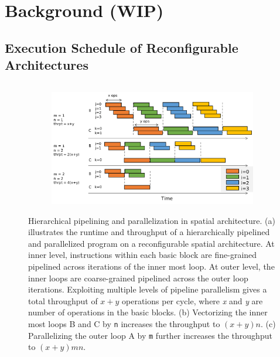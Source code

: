 \chapter{Background (WIP)}

\section{Execution Schedule of Reconfigurable Architectures} 
\begin{figure}
\begin{subfigure}[b]{0.34\textwidth}
\inputminted{python}{code/spatialeg2.py}
\caption {
}
\end{subfigure}
\hfill
\begin{subfigure}[b]{0.65\textwidth}
\centering
\includegraphics[width=1.0\textwidth]{figs/pipeexec.pdf}
\caption {
}
\end{subfigure}
\caption[Hiearchical pipelining and parallelization on spatial architecture]{
Hierarchical pipelining and parallelization in spatial architecture.
(a) illustrates the runtime and throughput of a hierarchically pipelined and parallelized program on
a reconfigurable spatial architecture. 
At inner level, instructions within each basic
block are fine-grained pipelined across iterations of the inner most loop. 
At outer level, the inner loops are coarse-grained pipelined across the outer loop iterations.
Exploiting multiple levels of pipeline parallelism gives a total throughput of $x+y$ operations per
  cycle, where \emph{x} and \emph{y} are number of operations in the basic blocks.
(b) Vectorizing the inner most loops B and C by \texttt{n} increases the throughput to $(x+y)n$.
(c) Parallelizing the outer loop A by \texttt{m} further increases the throughput to $(x+y)mn$.
}
\label{fig:pipeexec}
\end{figure}

